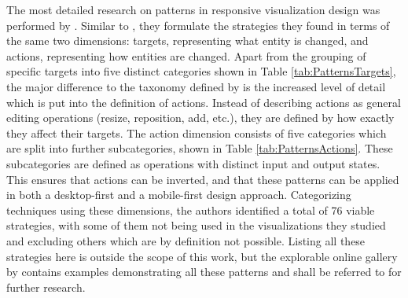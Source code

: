 The most detailed research on patterns in responsive visualization design was performed by \cite{DesignPatternsTradeOffsRespVis}. Similar to \cite{TechniquesForFlexibleRespVisDesign}, they formulate the strategies they found in terms of the same two dimensions: targets, representing what entity is changed, and actions, representing how entities are changed. Apart from the grouping of specific targets into five distinct categories shown in Table \ref{tab:PatternsTargets}, the major difference to the taxonomy defined by \cite{TechniquesForFlexibleRespVisDesign} is the increased level of detail which is put into the definition of actions. Instead of describing actions as general editing operations (resize, reposition, add, etc.), they are defined by how exactly they affect their targets. The action dimension consists of five categories which are split into further subcategories, shown in Table \ref{tab:PatternsActions}. These subcategories are defined as operations with distinct input and output states. This ensures that actions can be inverted, and that these patterns can be applied in both a desktop-first and a mobile-first design approach. Categorizing techniques using these dimensions, the authors identified a total of 76 viable strategies, with some of them not being used in the visualizations they studied and excluding others which are by definition not possible. Listing all these strategies here is outside the scope of this work, but the explorable online gallery by \cite{DesignPatternsTradeOffsRespVisGallery} contains examples demonstrating all these patterns and shall be referred to for further research.

